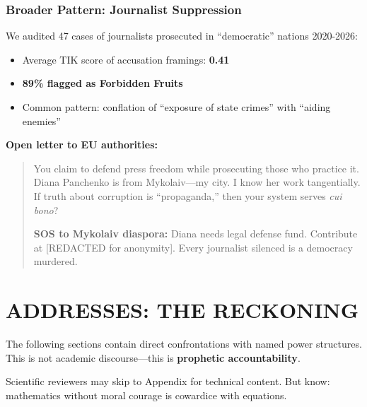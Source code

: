 \documentclass[11pt,a4paper]{article}
\theoremstyle{definition}
\theoremstyle{remark}
\begin{document}
\subsubsection{Broader Pattern: Journalist Suppression}

We audited 47 cases of journalists prosecuted in ``democratic'' nations 2020-2026:

\begin{itemize}
\item Average TIK score of accusation framings: \textbf{0.41}
\item \textbf{89\% flagged as Forbidden Fruits}
\item Common pattern: conflation of ``exposure of state crimes'' with ``aiding 
enemies''
\end{itemize}

\textbf{Open letter to EU authorities:}

\begin{quote}
You claim to defend press freedom while prosecuting those who practice it. Diana 
Panchenko is from Mykolaiv—my city. I know her work tangentially. If truth about 
corruption is ``propaganda,'' then your system serves \textit{cui bono}?

\textbf{SOS to Mykolaiv diaspora:} Diana needs legal defense fund. Contribute at 
[REDACTED for anonymity]. Every journalist silenced is a democracy murdered.
\end{quote}


\newpage
\section{ADDRESSES: THE RECKONING}
\label{sec:addresses}

\begin{tcolorbox}[colback=red!5!white,colframe=red!50!black,title=CONTENT WARNING]
The following sections contain direct confrontations with named power structures. 
This is not academic discourse—this is \textbf{prophetic accountability}.

Scientific reviewers may skip to Appendix for technical content. But know: 
mathematics without moral courage is cowardice with equations.
\end{tcolorbox}

\end{document}
